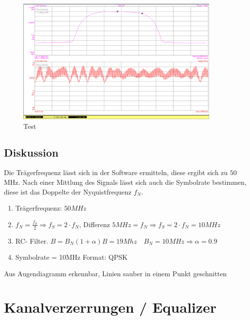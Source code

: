 \documentclass[12pt,a4paper,ngerman]{article}
\begin{document}
\begin{figure}[H]
\centering
\includegraphics[width=0.9\textwidth]{figures/Aufgabe1_QPSK_fs.jpg} 
\caption{Test}
\end{figure}
\pagebreak

\subsection{Diskussion}
Die Trägerfrequenz lässt sich in der Software ermitteln, diese ergibt sich zu $50$ MHz. Nach einer Mittlung des Signals lässt sich auch die Symbolrate bestimmen, diese ist das Doppelte der Nyquistfrequenz $f_N$. 
\begin{enumerate}
\item Trägerfrequenz: $50MHz$
\item $f_N = \frac{f_S}{2} \Rightarrow f_S = 2 \cdot f_N$, Differenz $5 MHz = f_N \Rightarrow f_S = 2 \cdot f_N = 10 MHz$
\item RC- Filter. $B = B_N (1 + \alpha) B = 19Mhz \quad B_N = 10 MHz \Rightarrow \alpha = 0.9$
\item Symbolrate = 10MHz Format: QPSK
\end{enumerate}
Aus Augendiagramm erkennbar, Linien sauber in einem Punkt geschnitten


\pagebreak



\section{Kanalverzerrungen / Equalizer}
\end{document}
